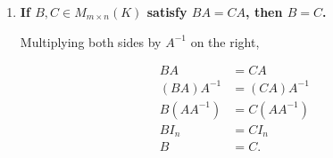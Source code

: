 \begin{enumerate}[label=\alph*)]
\item \textbf{If $B,C\in M_{m\times n}(K)$
satisfy $BA=CA$, then $B=C$.}

\begin{answer}
    Multiplying both sides by $A^{-1}$
    on the right,

    $$
    \begin{aligned}
    BA &= CA\\
    (BA)A^{-1} &= (CA)A^{-1}\\
    B(AA^{-1}) &= C(AA^{-1})\\
    BI_n &= CI_n\\
    B &= C.
    \end{aligned}
    $$
\end{answer}

\end{enumerate}